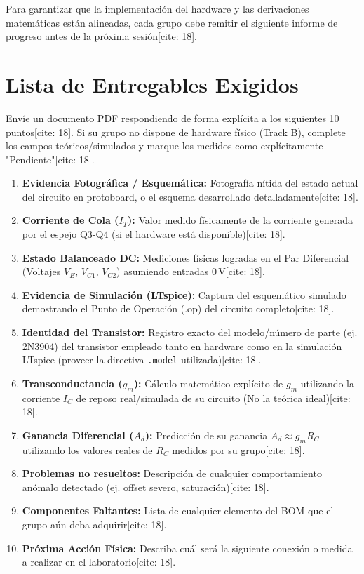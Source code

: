 \documentclass[11pt, a4paper]{article}
\begin{document}
\begin{tcolorbox}[colback=ucbblue!5, colframe=ucbblue, title=\textbf{Requisito de Avance: Entre Sesiones (Pre-Lab Hito 2)}]
    Para garantizar que la implementación del hardware y las derivaciones matemáticas están alineadas, cada grupo debe remitir el siguiente informe de progreso antes de la próxima sesión[cite: 18].
\end{tcolorbox}

\section*{Lista de Entregables Exigidos}
Envíe un documento PDF respondiendo de forma explícita a los siguientes 10 puntos[cite: 18]. Si su grupo no dispone de hardware físico (Track B), complete los campos teóricos/simulados y marque los medidos como explícitamente "Pendiente"[cite: 18].

\begin{enumerate}
    \item \textbf{Evidencia Fotográfica / Esquemática:} Fotografía nítida del estado actual del circuito en protoboard, o el esquema desarrollado detalladamente[cite: 18].
    \item \textbf{Corriente de Cola ($I_T$):} Valor medido físicamente de la corriente generada por el espejo Q3-Q4 (si el hardware está disponible)[cite: 18].
    \item \textbf{Estado Balanceado DC:} Mediciones físicas logradas en el Par Diferencial (Voltajes $V_E$, $V_{C1}$, $V_{C2}$) asumiendo entradas $0\,\text{V}$[cite: 18].
    \item \textbf{Evidencia de Simulación (LTspice):} Captura del esquemático simulado demostrando el Punto de Operación (.op) del circuito completo[cite: 18].
    \item \textbf{Identidad del Transistor:} Registro exacto del modelo/número de parte (ej. 2N3904) del transistor empleado tanto en hardware como en la simulación LTspice (proveer la directiva \texttt{.model} utilizada)[cite: 18].
    \item \textbf{Transconductancia ($g_m$):} Cálculo matemático explícito de $g_m$ utilizando la corriente $I_C$ de reposo real/simulada de su circuito (No la teórica ideal)[cite: 18].
    \item \textbf{Ganancia Diferencial ($A_d$):} Predicción de su ganancia $A_d \approx g_m R_C$ utilizando los valores reales de $R_C$ medidos por su grupo[cite: 18].
    \item \textbf{Problemas no resueltos:} Descripción de cualquier comportamiento anómalo detectado (ej. offset severo, saturación)[cite: 18].
    \item \textbf{Componentes Faltantes:} Lista de cualquier elemento del BOM que el grupo aún deba adquirir[cite: 18].
    \item \textbf{Próxima Acción Física:} Describa cuál será la siguiente conexión o medida a realizar en el laboratorio[cite: 18].
\end{enumerate}
\end{document}
